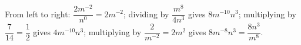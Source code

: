 From left to right: $\dfrac{2m^{-2}}{n^0}=2m^{-2}$; dividing by $\dfrac{m^8}{4n^3}$ gives $8m^{-10}n^3$; multiplying by $\dfrac{7}{14}=\dfrac{1}{2}$ gives $4m^{-10}n^3$; multiplying by $\dfrac{2}{m^{-2}}=2m^2$ gives $8m^{-8}n^3=\boxed{\dfrac{8n^3}{m^8}}$.
